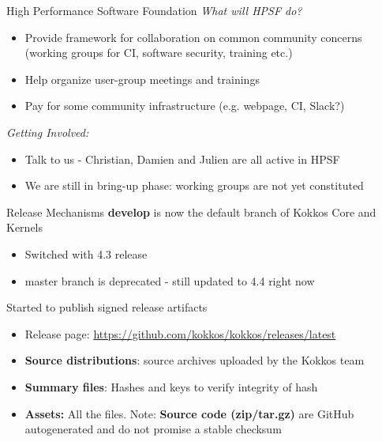 \begin{frame}[fragile]{High Performance Software Foundation}
\textit{What will HPSF do?}
\begin{itemize}
  \item Provide framework for collaboration on common community concerns (working groups for CI, software security, training etc.)
  \item Help organize user-group meetings and trainings
  \item Pay for some community infrastructure (e.g. webpage, CI, Slack?)
\end{itemize}

\textit{Getting Involved:}
\begin{itemize}
  \item Talk to us - Christian, Damien and Julien are all active in HPSF
  \item We are still in bring-up phase: working groups are not yet constituted
\end{itemize}
\end{frame}

\begin{frame}[fragile]{Release Mechanisms}
\textbf{develop} is now the default branch of Kokkos Core and Kernels
\begin{itemize}
  \item{Switched with 4.3 release}
  \item{master branch is deprecated - still updated to 4.4 right now}
\end{itemize}

Started to publish signed release artifacts
\begin{itemize}
  \item{Release page: \url{https://github.com/kokkos/kokkos/releases/latest}}
  \item \textbf{Source distributions}: source archives uploaded by the Kokkos team
  \item \textbf{Summary files}: Hashes and keys to verify integrity of hash
  \item \textbf{Assets:} All the files. Note: \textbf{Source code (zip/tar.gz)} are GitHub autogenerated and do not promise a stable checksum
\end{itemize}
\end{frame}

